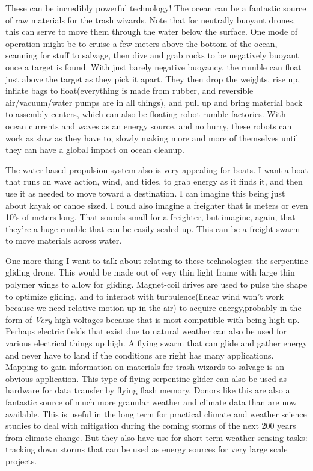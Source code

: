 These can be incredibly powerful technology! The ocean can be a
fantastic source of raw materials for the trash wizards. Note that for
neutrally buoyant drones, this can serve to move them through the water
below the surface. One mode of operation might be to cruise a few meters
above the bottom of the ocean, scanning for stuff to salvage, then dive
and grab rocks to be negatively buoyant once a target is found. With
just barely negative buoyancy, the rumble can float just above the
target as they pick it apart. They then drop the weights, rise up,
inflate bags to float(everything is made from rubber, and reversible
air/vacuum/water pumps are in all things), and pull up and bring
material back to assembly centers, which can also be floating robot
rumble factories. With ocean currents and waves as an energy source, and
no hurry, these robots can work as slow as they have to, slowly making
more and more of themselves until they can have a global impact on ocean
cleanup.

The water based propulsion system also is very appealing for boats. I
want a boat that runs on wave action, wind, and tides, to grab energy as
it finds it, and then use it as needed to move toward a destination. I
can imagine this being just about kayak or canoe sized. I could also
imagine a freighter that is meters or even 10's of meters long. That
sounds small for a freighter, but imagine, again, that they're a huge
rumble that can be easily scaled up. This can be a freight swarm to move
materials across water.

One more thing I want to talk about relating to these technologies: the
serpentine gliding drone. This would be made out of very thin light
frame with large thin polymer wings to allow for gliding. Magnet-coil
drives are used to pulse the shape to optimize gliding, and to interact
with turbulence(linear wind won't work because we need relative motion
up in the air) to acquire energy,probably in the form of \emph{Very}
high voltages because that is most compatible with being high up.
Perhaps electric fields that exist due to natural weather can also be
used for various electrical things up high. A flying swarm that can
glide and gather energy and never have to land if the conditions are
right has many applications. Mapping to gain information on materials
for trash wizards to salvage is an obvious application. This type of
flying serpentine glider can also be used as hardware for data transfer
by flying flash memory. Donors like this are also a fantastic source of
much more granular weather and climate data than are now available. This
is useful in the long term for practical climate and weather science
studies to deal with mitigation during the coming storms of the next 200
years from climate change. But they also have use for short term weather
sensing tasks: tracking down storms that can be used as energy sources
for very large scale projects.

